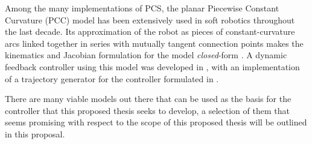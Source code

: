 Among the many implementations of PCS, the planar Piecewise Constant Curvature (PCC) model has been extensively used in soft robotics throughout the last decade. Its approximation of the robot as pieces of constant-curvature arcs linked together in series with mutually tangent connection points makes the kinematics and Jacobian formulation for the model \textit{closed}-form \cite{websteriii_design_2010}. A dynamic feedback controller using this model was developed in \cite{della_santina_model-based_2020}, with an implementation of a trajectory generator for the controller formulated in \cite{dickson_real-time_2025}. 

There are many viable models out there that can be used as the basis for the controller that this proposed thesis seeks to develop, a selection of them that seems promising with respect to the scope of this proposed thesis will be outlined in this proposal.